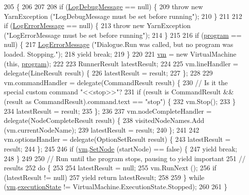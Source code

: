 \begin{DoxyCode}
205                                                                                              \{
206 
207 
208             \textcolor{keywordflow}{if} (\hyperlink{a00050_a381f48bb0fbb294f8cf44ca57f11be31}{LogDebugMessage} == null) \{
209                 \textcolor{keywordflow}{throw} \textcolor{keyword}{new} YarnException (\textcolor{stringliteral}{"LogDebugMessage must be set before running"});
210             \}
211 
212             \textcolor{keywordflow}{if} (\hyperlink{a00050_a9801e83dd044d6498fdf6ebcc6bec5ac}{LogErrorMessage} == null) \{
213                 \textcolor{keywordflow}{throw} \textcolor{keyword}{new} YarnException (\textcolor{stringliteral}{"LogErrorMessage must be set before running"});
214             \}
215 
216             \textcolor{keywordflow}{if} (\hyperlink{a00050_a0a1cca92325f430425d784d416cb5c2b}{program} == null) \{
217                 \hyperlink{a00050_a9801e83dd044d6498fdf6ebcc6bec5ac}{LogErrorMessage} (\textcolor{stringliteral}{"Dialogue.Run was called, but no program was loaded.
       Stopping."});
218                 yield \textcolor{keywordflow}{break};
219             \}
220 
221             \hyperlink{a00050_a8c1319357a9df6cff051328fb33224c7}{vm} = \textcolor{keyword}{new} VirtualMachine (\textcolor{keyword}{this}, \hyperlink{a00050_a0a1cca92325f430425d784d416cb5c2b}{program});
222 
223             RunnerResult latestResult;
224 
225             vm.lineHandler = delegate(LineResult result) \{
226                 latestResult = result;
227             \};
228 
229             vm.commandHandler = delegate(CommandResult result) \{
230                 \textcolor{comment}{// Is it the special custom command "<<stop>>"?}
231                 \textcolor{keywordflow}{if} (result is CommandResult && (result as CommandResult).command.text == \textcolor{stringliteral}{"stop"}) \{
232                     vm.Stop();
233                 \}
234                 latestResult = result;
235             \};
236 
237             vm.nodeCompleteHandler = delegate(NodeCompleteResult result) \{
238                 visitedNodeNames.Add (vm.currentNodeName);
239                 latestResult = result;
240             \};
241 
242             vm.optionsHandler = delegate(OptionSetResult result) \{
243                 latestResult = result;
244             \};
245 
246             \textcolor{keywordflow}{if} (\hyperlink{a00050_a8c1319357a9df6cff051328fb33224c7}{vm}.\hyperlink{a00086_a6364593ea1115d65e34b343422cfbbbd}{SetNode} (startNode) == \textcolor{keyword}{false}) \{
247                 yield \textcolor{keywordflow}{break};
248             \}
249 
250             \textcolor{comment}{// Run until the program stops, pausing to yield important}
251             \textcolor{comment}{// results}
252             \textcolor{keywordflow}{do} \{
253 
254                 latestResult = null;
255                 vm.RunNext ();
256                 \textcolor{keywordflow}{if} (latestResult != null)
257                     yield \textcolor{keywordflow}{return} latestResult;
258 
259             \} \textcolor{keywordflow}{while} (\hyperlink{a00050_a8c1319357a9df6cff051328fb33224c7}{vm}.\hyperlink{a00086_a66491da06023dabfb63d09e6ccbba74f}{executionState} != VirtualMachine.ExecutionState.Stopped);
260 
261         \}
\end{DoxyCode}

